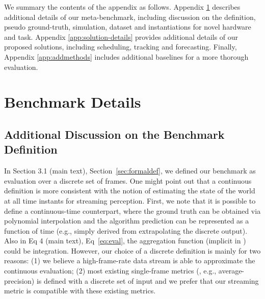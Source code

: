 \ifmuteappendixcite
\renewcommand{\cite}[1]{}
\fi

\ifstandalonesupplement



\setcounter{tocdepth}{2}
{\hypersetup{linkcolor=black}
\tableofcontents
}
\clearpage

\else





\fi

We summary the contents of the appendix as follows. Appendix \ref{app:bench-details} describes additional details of our meta-benchmark, including discussion on the definition, pseudo ground-truth, simulation, dataset and instantiations for novel hardware and task. Appendix \ref{app:solution-details} provides additional details of our proposed solutions, including scheduling, tracking and forecasting. Finally, Appendix \ref{app:addmethods} includes additional baselines for a more thorough evaluation.

\section{Benchmark Details}
\label{app:bench-details}



\subsection{Additional Discussion on the Benchmark Definition}
\label{app:benchdef}

In 
\ifstandalonesupplement
    Section 3.1 (main text),
\else
    Section~\ref{sec:formaldef},
\fi
we defined our benchmark as evaluation over a discrete set of frames. One might point out that a continuous definition is more consistent with the notion of estimating the state of the world at all time instants for streaming perception. First, we note that it is possible to define a continuous-time counterpart, where the ground truth can be obtained via polynomial interpolation and the algorithm prediction can be represented as a function of time (e.g., simply derived from extrapolating the discrete output). Also in
\ifstandalonesupplement
    Eq 4 (main text),
\else
    Eq~\ref{eq:eval},
\fi
the aggregation function (implicit in ) could be integration. However, our choice of a discrete definition is mainly for two reasons: (1) we believe a high-frame-rate data stream is able to approximate the continuous evaluation; (2) most existing single-frame metrics (, e.g., average-precision) is defined with a discrete set of input and we prefer that our streaming metric is compatible with these existing metrics. 


